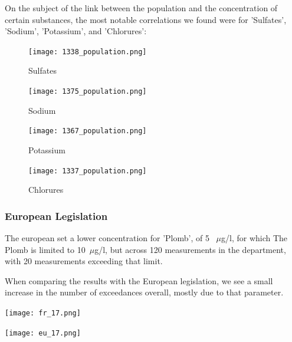 \documentclass{article}
\begin{document}
\vspace{-1em}

\noindent
On the subject of the link between the population and the concentration of certain substances, the most notable correlations we found were for 'Sulfates', 'Sodium', 'Potassium', and 'Chlorures':

\begin{figure}[H]
    \centering
    \begin{minipage}{0.48\textwidth}
        \centering
        \texttt{[image: 1338\_population.png]}
        \caption*{Sulfates}
    \end{minipage}
    \hfill
    \begin{minipage}{0.48\textwidth}
        \centering
        \texttt{[image: 1375\_population.png]}
        \caption*{Sodium}
    \end{minipage}
\end{figure}

\newpage

\begin{figure}[H]
    \centering
    \begin{minipage}{0.48\textwidth}
        \centering
        \texttt{[image: 1367\_population.png]}
        \caption*{Potassium}
    \end{minipage}
    \hfill
    \begin{minipage}{0.48\textwidth}
        \centering
        \texttt{[image: 1337\_population.png]}
        \caption*{Chlorures}
    \end{minipage}
\end{figure}

\subsubsection{European Legislation}
The european set a lower concentration for 'Plomb', of 5 ~$\mu$g/l, for which 
The Plomb is limited to 10~$\mu$g/l, but across 120 measurements in the department, with 20 measurements exceeding that limit.

When comparing the results with the European legislation, we see a small increase in the number of exceedances overall, mostly due to that parameter.
\begin{center}
\begin{minipage}{0.48\textwidth}
    \centering
    \texttt{[image: fr\_17.png]}
\end{minipage}\hfill
\begin{minipage}{0.48\textwidth}
    \centering
    \texttt{[image: eu\_17.png]}
\end{minipage}
\end{center}
\end{document}
